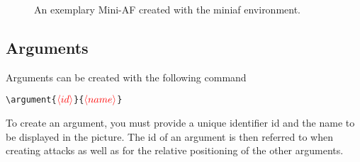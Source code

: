 \documentclass{article}
\newcommand{\opt}[1]{\ensuremath{\textcolor[rgb]{1.00,0.00,0.00}{\langle #1\rangle}}}
\begin{document}
\begin{figure}[ht]
    \centering
    \begin{miniaf}





    \end{miniaf}
    \caption{An exemplary Mini-AF created with the \textsf{miniaf} environment.}
    \label{fig:example_mini}
\end{figure}


\subsection{Arguments}
    Arguments can be created with the following command

    \verb|\argument{|\opt{id}\verb|}{|\opt{name}\verb|}|

    \noindent
    To create an argument, you must provide a unique identifier \textsf{id} and the \textsf{name} to be displayed in the picture.
    The \textsf{id} of an argument is then referred to when creating attacks as well as for the relative positioning of the other arguments.
\end{document}
